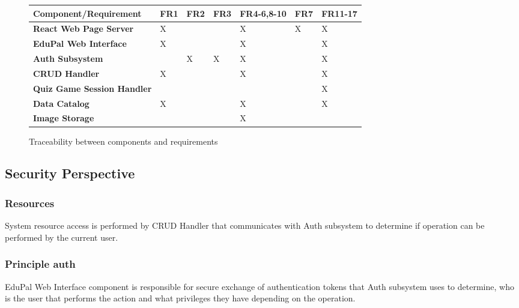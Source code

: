 \begin{figure}[H]
  \label{tab:functional-viewpoint-component-traceability-v2}
  \centering
  \begin{adjustbox}{max width=\textwidth}
      \begin{tabular}{|l|l|l|l|l|l|l|}
      \hline
          \textbf{Component/Requirement} & \textbf{FR1} & \textbf{FR2} & \textbf{FR3} & \textbf{FR4-6,8-10} & \textbf{FR7} & \textbf{FR11-17} \\ \hline
          \textbf{React Web Page Server} & X & ~ & ~ & X & X & X \\ \hline
          \textbf{EduPal Web Interface} & X & ~ & ~ & X & ~ & X \\ \hline
          \textbf{Auth Subsystem} & ~ & X & X & X & ~ & X \\ \hline
          \textbf{CRUD Handler} & X & ~ & ~ & X & ~ & X \\ \hline
          \textbf{Quiz Game Session Handler} & ~ & ~ & ~ & ~ & ~ & X \\ \hline
          \textbf{Data Catalog} & X & ~ & ~ & X & ~ & X \\ \hline
          \textbf{Image Storage} & ~ & ~ & ~ & X & ~ & ~ \\ \hline
      \end{tabular}
\end{adjustbox}
  \caption{Traceability between components and requirements}
\end{figure}

\subsection{Security Perspective}

\subsubsection{Resources}

System resource access is performed by CRUD Handler that communicates with Auth subsystem to determine if operation can be performed by the current user.

\subsubsection{Principle auth}

EduPal Web Interface component is responsible for secure exchange of authentication tokens that Auth subsystem uses to determine, who is the user that performs the action and what privileges they have depending on the operation.

